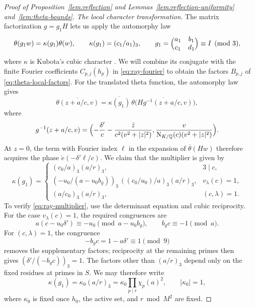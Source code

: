 \documentclass[11pt,a4paper]{article}
\numberwithin{equation}{section}
\numberwithin{figure}{section}
\theoremstyle{definition}
\theoremstyle{remark}
\newcommand{\Q}{\mathbb Q}
\newcommand{\NK}{\mathrm N_{K/\Q}}
\begin{document}
\begin{proof}[Proof of Proposition~\ref{lem:reflection} and Lemmas~\ref{lem:reflection-uniformity} and~\ref{lem:theta-bounds}]
\noindent\textit{The local character transformation.}\quad
The matrix factorization $g=g_1H$ lets us apply the automorphy law
\[
 \theta(g_1w)=\kappa(g_1)\theta(w),\qquad
 \kappa(g_1)=(c_1/a_1)_3,\qquad
 g_1=\Bigl(\begin{matrix}a_1&b_1\\c_1&d_1\end{matrix}\Bigr)\equiv I\pmod3,
\]
where $\kappa$ is Kubota's cubic character \cite[(5.4), (5.6)]{DR}.
We will combine its conjugate with the finite Fourier coefficients
$C_{p,j}(h_p)$ in \eqref{eq:ray-fourier} to obtain the factors
$B_{p,j}$ of \eqref{eq:theta-local-factors}.
For the translated theta function, the automorphy law gives
\begin{equation}\label{eq:theta-cusp-automorphy}
 \overline{\theta(z+a/c,v)}
 =\overline{\kappa(g_1)}\,\overline{\theta\bigl(Hg^{-1}(z+a/c,v)\bigr)},
\end{equation}
where
\begin{equation}\label{eq:theta-cusp-coordinates}
 g^{-1}(z+a/c,v)
 =\Bigl(-\frac{\delta'}c-\frac{\bar z}{c^2(v^2+|z|^2)},
          \frac{v}{\NK(c)(v^2+|z|^2)}\Bigr).
\end{equation}
At $z=0$, the term with Fourier index $\ell$ in the expansion of
$\overline\theta(Hw)$ therefore acquires the phase
$\breve e(-\delta'\ell/c)$.
We claim that the multiplier is given by
\begin{equation}\label{eq:ray-multiplier}
\kappa(g_1)=
 \begin{cases}
 (c_0/a)_3(a/r)_3,&3\mid c,\\
 (-u_0/(a-u_0b_g))_3\,((c_0/u_0)/a)_3(a/r)_3,
        &v_\lambda(c)=1,\\
 (a/c_0)_3(a/r)_3,&(c,\lambda)=1.
 \end{cases}
\end{equation}
To verify \eqref{eq:ray-multiplier}, use the determinant equation
and cubic reciprocity. For the case $v_\lambda(c)=1$, the required
congruences are
\[
 a(c-u_0\delta')\equiv-u_0\pmod{a-u_0b_g},
 \qquad b_gc\equiv-1\pmod a.
\]
For $(c,\lambda)=1$, the congruence
\[
 -b_gc=1-a\delta'\equiv1\pmod9
\]
removes the supplementary factors; reciprocity at the remaining
primes then gives $(\delta'/(-b_gc))_3=1$.
The factors other than $(a/r)_3$ depend only on the fixed residues
at primes in $S$. We may therefore write
\[
 \kappa(g_1)=\kappa_0(a/r)_3
          =\kappa_0\prod_{p\mid r}\chi_p(a)^2,
 \qquad |\kappa_0|=1,
\]
where $\kappa_0$ is fixed once $h_0$, the active set, and
$r\bmod M^2$ are fixed.


\end{proof}
\end{document}
